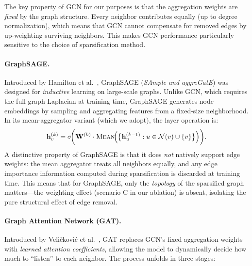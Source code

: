 \documentclass[conference]{IEEEtran}
\begin{document}
The key property of GCN for our purposes is that the aggregation weights are \emph{fixed} by the graph structure. Every neighbor contributes equally (up to degree normalization), which means that GCN cannot compensate for removed edges by up-weighting surviving neighbors. This makes GCN performance particularly sensitive to the choice of sparsification method.

\paragraph{GraphSAGE.} Introduced by Hamilton et al.~\cite{hamilton2017}, GraphSAGE (\emph{SAmple and aggreGatE}) was designed for \emph{inductive} learning on large-scale graphs. Unlike GCN, which requires the full graph Laplacian at training time, GraphSAGE generates node embeddings by sampling and aggregating features from a fixed-size neighborhood. In its mean-aggregator variant (which we adopt), the layer operation is:
\begin{equation}
    \mathbf{h}_v^{(k)} = \sigma\!\bigg(\mathbf{W}^{(k)} \cdot \textsc{Mean}\!\Big(\big\{\mathbf{h}_u^{(k-1)} : u \in \mathcal{N}(v) \cup \{v\}\big\}\Big)\bigg).
    \label{eq:sage}
\end{equation}
A distinctive property of GraphSAGE is that it does \emph{not} natively support edge weights: the mean aggregator treats all neighbors equally, and any edge importance information computed during sparsification is discarded at training time. This means that for GraphSAGE, only the \emph{topology} of the sparsified graph matters---the weighting effect (scenario C in our ablation) is absent, isolating the pure structural effect of edge removal.

\paragraph{Graph Attention Network (GAT).} Introduced by Veli\v{c}kovi\'{c} et al.~\cite{velickovic2018}, GAT replaces GCN's fixed aggregation weights with \emph{learned attention coefficients}, allowing the model to dynamically decide how much to ``listen'' to each neighbor. The process unfolds in three stages:
\end{document}
